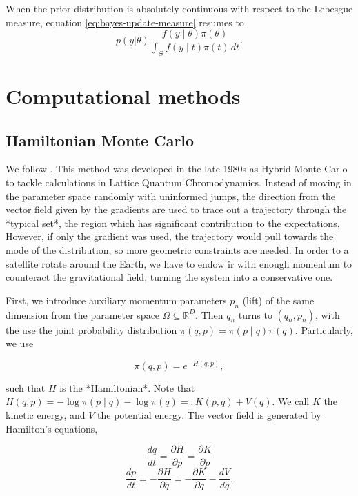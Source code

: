 When the prior distribution is absolutely continuous with respect to the
Lebesgue measure, equation \eqref{eq:bayes-update-measure} resumes to 
\begin{equation}
  p(y|\theta) \frac{f(y\mid \theta)\pi(\theta)}{\int_{\Theta} f(y\mid t)\pi(t) \, dt}.  
\end{equation}

\section{Computational methods}
\label{sec:computational_methods}

\subsection{Hamiltonian Monte Carlo}
\label{sec:hamiltonian-monte-carlo}

We follow \cite{betancourt2017conceptual}. This method was developed in the late 1980s as Hybrid Monte Carlo to tackle calculations in Lattice Quantum Chromodynamics. Instead of moving in the parameter space randomly with uninformed jumps, the direction from the vector field given by the gradients are used to trace out a trajectory through the *typical set*, the region which has significant contribution to the expectations. However, if only the gradient was used, the trajectory would pull towards the mode of the distribution, so more geometric constraints are needed. In order to a satellite rotate around the Earth, we have to endow ir with enough momentum to counteract the gravitational field, turning the system into a conservative one. 

First, we introduce auxiliary momentum parameters $p_n$ (lift) of the same dimension from the parameter space $\Omega \subseteq \mathbb{R}^D$. Then $q_n$ turns to $(q_n, p_n)$, with the use the joint probability distribution $\pi(q,p) = \pi(p\mid q)\pi(q)$. Particularly, we use 

$$
\pi(q,p) = e^{-H(q,p)}, 
$$

such that $H$ is the *Hamiltonian*. Note that $H(q,p) = -\log \pi(p\mid q) - \log \pi(q) =: K(p,q) + V(q)$. We call $K$ the kinetic energy, and $V$ the potential energy. The vector field is generated by Hamilton's equations, 

$$
\frac{dq}{dt} = \frac{\partial H}{\partial p} = \frac{\partial K}{\partial p}
$$
$$
\frac{dp}{dt} = -\frac{\partial H}{\partial q} = -\frac{\partial K}{\partial q} - \frac{d V}{d q}.
$$

